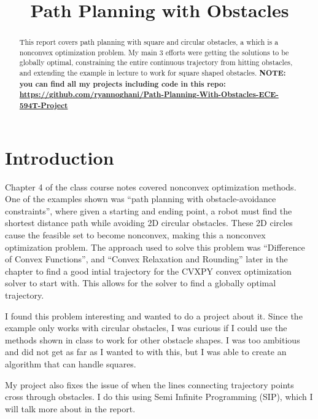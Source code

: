 \documentclass[conference]{IEEEtran}
\begin{document}
\title{Path Planning with Obstacles\\}
\author{
}
\maketitle
\begin{abstract} 
    This report covers path planning with square and circular obstacles, a which is a nonconvex optimization problem. My main 3 efforts were 
    getting the solutions to be globally optimal, constraining the entire continuous trajectory from hitting obstacles, 
    and extending the example in lecture to work for square shaped obstacles. \textbf{NOTE: you can find all my projects including code in this repo: \url{https://github.com/ryannoghani/Path-Planning-With-Obstacles-ECE-594T-Project}}
\end{abstract}
\section{Introduction}
Chapter 4 of the class course notes \cite{b1} covered nonconvex optimization methods. One of the examples 
shown was ``path planning with obstacle-avoidance constraints'', where given a starting and ending point, a 
robot must find the shortest distance path while avoiding 2D circular obstacles. These 2D circles cause the 
feasible set to become nonconvex, making this a nonconvex optimization problem. The approach used to solve 
this problem was ``Difference of 
Convex Functions'', and ``Convex Relaxation and Rounding'' later in the chapter to find 
a good intial trajectory for the CVXPY convex optimization solver to start with. This allows for the solver
to find a globally optimal trajectory.

I found this problem interesting and wanted to do a project about it.
Since the example only works with circular obstacles, I was curious if I could use the methods shown in class to 
work for other obstacle shapes. I was too ambitious and did not get as far as I wanted to with this, but I was able to create 
an algorithm that can handle squares.

My project also fixes the issue of when the lines connecting trajectory points cross through obstacles. I do this 
using Semi Infinite Programming (SIP), which I will talk more about in the report.
\end{document}
